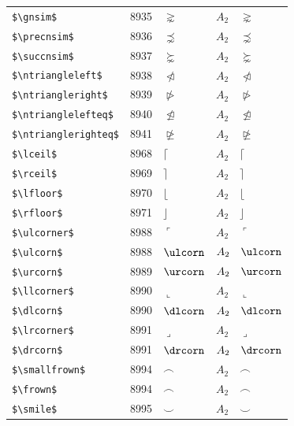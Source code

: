 ﻿\documentclass{article}
\begin{document}
\begin{table}
\begin{center}
\begin{tabular}{llll}
 \verb#$\gnsim$#              & 8935    & $\gnsim$              & $A_2\quad \gnsim$\\
 \verb#$\precnsim$#           & 8936    & $\precnsim$           & $A_2\quad \precnsim$\\
 \verb#$\succnsim$#           & 8937    & $\succnsim$           & $A_2\quad \succnsim$\\
 \verb#$\ntriangleleft$#      & 8938    & $\ntriangleleft$      & $A_2\quad \ntriangleleft$\\
 \verb#$\ntriangleright$#     & 8939    & $\ntriangleright$     & $A_2\quad \ntriangleright$\\
 \verb#$\ntrianglelefteq$#    & 8940    & $\ntrianglelefteq$    & $A_2\quad \ntrianglelefteq$\\
 \verb#$\ntrianglerighteq$#   & 8941    & $\ntrianglerighteq$   & $A_2\quad \ntrianglerighteq$\\
 \verb#$\lceil$#              & 8968    & $\lceil$              & $A_2\quad \lceil$\\
 \verb#$\rceil$#              & 8969    & $\rceil$              & $A_2\quad \rceil$\\
 \verb#$\lfloor$#             & 8970    & $\lfloor$             & $A_2\quad \lfloor$\\
 \verb#$\rfloor$#             & 8971    & $\rfloor$             & $A_2\quad \rfloor$\\
 \verb#$\ulcorner$#           & 8988    & $\ulcorner$           & $A_2\quad \ulcorner$\\
 \verb#$\ulcorn$#             & 8988    & $\ulcorn$             & $A_2\quad \ulcorn$\\
 \verb#$\urcorn$#             & 8989    & $\urcorn$             & $A_2\quad \urcorn$\\
 \verb#$\llcorner$#           & 8990    & $\llcorner$           & $A_2\quad \llcorner$\\
 \verb#$\dlcorn$#             & 8990    & $\dlcorn$             & $A_2\quad \dlcorn$\\
 \verb#$\lrcorner$#           & 8991    & $\lrcorner$           & $A_2\quad \lrcorner$\\
 \verb#$\drcorn$#             & 8991    & $\drcorn$             & $A_2\quad \drcorn$\\
 \verb#$\smallfrown$#         & 8994    & $\smallfrown$         & $A_2\quad \smallfrown$\\
 \verb#$\frown$#              & 8994    & $\frown$              & $A_2\quad \frown$\\
 \verb#$\smile$#              & 8995    & $\smile$              & $A_2\quad \smile$\\

\end{tabular}
\end{center}
\end{table}
\end{document}
